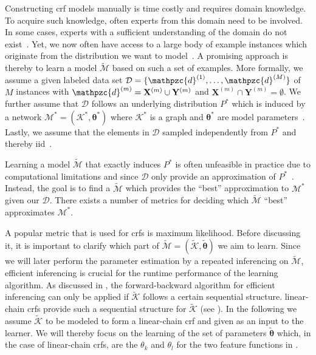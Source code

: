 Constructing \gls{crf} models manually is time costly and requires domain knowledge.
To acquire such knowledge, often experts from this domain need to be involved.
In some cases, experts with a sufficient understanding of the domain do not exist~\citep{koller2009probabilistic}.
Yet, we now often have access to a large body of example instances which originate from the distribution we want to model~\citep{koller2009probabilistic}.
A promising approach is thereby to learn a model $\mathcal{\tilde{M}}$ based on such a set of examples.
More formally, we assume a given labeled data set $\mathcal{D}=\{\mathpzc{d}^{(1)},\dots,\mathpzc{d}^{(M)}\}$ of $M$ instances with $\mathpzc{d}^{(m)}=\mathbf{X}^{(m)}\cup\mathbf{Y}^{(m)}$ and $\mathbf{X}^{(m)}\cap\mathbf{Y}^{(m)}=\emptyset$.
We further assume that $\mathcal{D}$ follows an underlying distribution $P^*$ which is induced by a network $\mathcal{M}^*=(\mathcal{K}^*,\bm{\theta}^*)$ where $\mathcal{K}^*$ is a graph and $\bm{\theta}^*$ are model parameters~\citep{koller2009probabilistic}.
Lastly, we assume that the elements in $\mathcal{D}$ sampled independently from $P^*$ and thereby \acrfull{iid}~\citep{koller2009probabilistic}.

\bigskip

Learning a model $\mathcal{\tilde{M}}$ that exactly induces $P^*$ is often unfeasible in practice due to computational limitations and since $\mathcal{D}$ only provide an approximation of $P^*$~\citep{koller2009probabilistic}.
Instead, the goal is to find a $\mathcal{\tilde{M}}$ which provides the ``best'' approximation to $\mathcal{M}^*$ given our $\mathcal{D}$.
There exists a number of metrics for deciding which $\mathcal{\tilde{M}}$ ``best'' approximates $\mathcal{M}^*$.

A popular metric that is used for \glspl{crf} is \gls{maximum likelihood}.
Before discussing it, it is important to clarify which part of $\mathcal{\tilde{M}}=(\mathcal{\tilde{K}},\bm{\tilde{\theta}})$ we aim to learn.
Since we will later perform the parameter estimation by a repeated inferencing on $\mathcal{\tilde{M}}$, efficient inferencing is crucial for the runtime performance of the learning algorithm.
As discussed in , the forward-backward algorithm for efficient inferencing can only be applied if $\mathcal{\tilde{K}}$ follows a certain sequential structure.
\Glspl{linear-chain crf} provide such a sequential structure for $\mathcal{\tilde{K}}$ (see ).
In the following we assume $\mathcal{\tilde{K}}$ to be modeled to form a \gls{linear-chain crf} and given as an input to the learner.
We will thereby focus on the learning of the set of parameters $\bm{\tilde{\theta}}$ which, in the case of \glspl{linear-chain crf}, are the $\theta_k$ and $\theta_l$ for the two \glspl{feature function} in .

